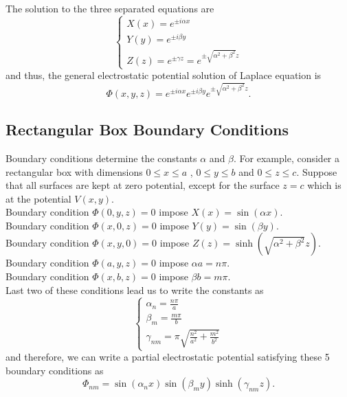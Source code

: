 The solution to the three separated equations are
\begin{equation}
\begin{cases}
X(x) = e^{\pm i\alpha x} \\
Y(y) = e^{\pm i\beta y} \\
Z(z) = e^{\pm \gamma z} = e^{\pm \sqrt{\alpha^2 + \beta^2} z}
\end{cases}
\end{equation}
and thus, the general electrostatic potential solution of Laplace equation is 
\begin{equation}
\Phi (x,y,z) = e^{\pm i\alpha x} e^{\pm i\beta y} e^{\pm \sqrt{\alpha^2 + \beta^2} z}.
\end{equation}

\subsection{Rectangular Box Boundary Conditions}
Boundary conditions determine the constants $\alpha$ and $\beta$. For example, consider a rectangular box with dimensions $0\le x \le a$ , $0\le y \le b$ and $0\le z \le c$. Suppose that all surfaces are kept at zero potential, except for the surface $z=c$ which is at the potential $V(x,y)$.\\

Boundary condition $\Phi (0,y,z)=0$ impose $X(x) = \sin (\alpha x)$. \\
Boundary condition $\Phi (x,0,z)=0$ impose $Y(y) = \sin (\beta y)$. \\
Boundary condition $\Phi (x,y,0)=0$ impose $Z(z) = \sinh (\sqrt{\alpha^2 + \beta^2 } z)$. \\
Boundary condition $\Phi (a,y,z)=0$ impose $\alpha a = n \pi$. \\
Boundary condition $\Phi (x,b,z)=0$ impose $\beta b = m \pi$. \\

Last two of these conditions lead us to write the constants as
\begin{equation}
\begin{cases}
\alpha_n = \frac{n\pi}{a} \\
\beta_m = \frac{m\pi}{b} \\
\gamma_{nm} = \pi \sqrt{\frac{n^2}{a^2} +\frac{m^2}{b^2}}
\end{cases}
\end{equation}
and therefore, we can write a partial  electrostatic potential satisfying these 5 boundary conditions as
\begin{equation}
\Phi_{nm} = \sin (\alpha_n x) \sin (\beta_m y) \sinh (\gamma_{nm} z).
\end{equation}

